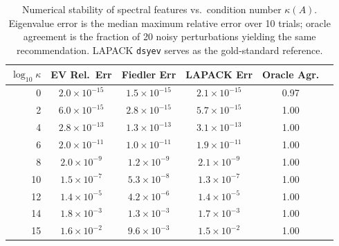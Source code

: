 \documentclass[11pt]{article}
\begin{document}
\begin{table}[t]
\centering
\caption{Numerical stability of spectral features vs.\ condition number $\kappa(A)$.
Eigenvalue error is the median maximum relative error over 10 trials;
oracle agreement is the fraction of 20 noisy perturbations yielding the same
recommendation. LAPACK \texttt{dsyev} serves as the gold-standard reference.}
\label{tab:stability}
\begin{tabular}{rccccc}
\toprule
$\log_{10}\kappa$ & \textbf{EV Rel.\ Err} & \textbf{Fiedler Err} & \textbf{LAPACK Err} & \textbf{Oracle Agr.} \\
\midrule
0  & $2.0 \times 10^{-15}$ & $1.5 \times 10^{-15}$ & $2.1 \times 10^{-15}$ & 0.97 \\
2  & $6.0 \times 10^{-15}$ & $2.8 \times 10^{-15}$ & $5.7 \times 10^{-15}$ & 1.00 \\
4  & $2.8 \times 10^{-13}$ & $1.3 \times 10^{-13}$ & $3.1 \times 10^{-13}$ & 1.00 \\
6  & $2.0 \times 10^{-11}$ & $1.0 \times 10^{-11}$ & $1.9 \times 10^{-11}$ & 1.00 \\
8  & $2.0 \times 10^{-9}$  & $1.2 \times 10^{-9}$  & $2.1 \times 10^{-9}$  & 1.00 \\
10 & $1.5 \times 10^{-7}$  & $5.3 \times 10^{-8}$  & $1.3 \times 10^{-7}$  & 1.00 \\
12 & $1.4 \times 10^{-5}$  & $4.2 \times 10^{-6}$  & $1.4 \times 10^{-5}$  & 1.00 \\
14 & $1.8 \times 10^{-3}$  & $1.3 \times 10^{-3}$  & $1.7 \times 10^{-3}$  & 1.00 \\
15 & $1.6 \times 10^{-2}$  & $9.6 \times 10^{-3}$  & $1.5 \times 10^{-2}$  & 1.00 \\
\bottomrule
\end{tabular}
\end{table}
\end{document}
